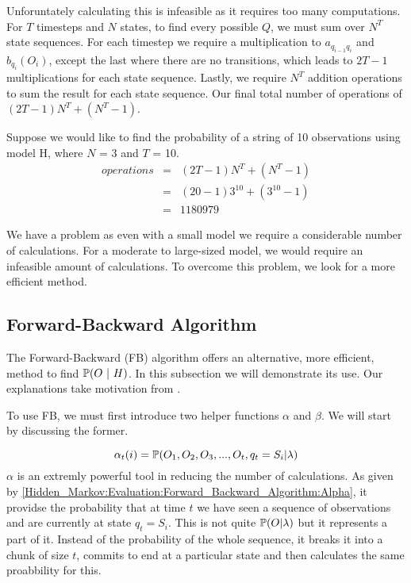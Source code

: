 Unforuntately calculating this is infeasible as it requires too many computations. For $T$ timesteps and $N$ states, to find every possible $Q$, we must sum over $N^T$ state sequences. For each timestep we require a multiplication to $a_{q_{i-1}q_{i}}$ and $b_{q_i}(O_i)$, except the last where there are no transitions, which leads to $2T-1$ multiplications for each state sequence. Lastly, we require $N^T$ addition operations to sum the result for each state sequence. Our final total number of operations of $(2T-1)N^T + (N^T-1)$. 

\begin{example}
    \label{Hidden_Markov:Evaluation:motivfb}
    Suppose we would like to find the probability of a string of 10 observations using model H, where $N$ = 3 and $T$ = 10. 
    \begin{eqnarray}
        operations & = & (2T-1)N^T + (N^T-1) \\
                   & = & (20-1)3^10 + (3^10 -1) \\
                   & = & 1180979
    \end{eqnarray}
\end{example}


We have a problem as even with a small model we require a considerable number of calculations. For a moderate to large-sized model, we would require an infeasible amount of calculations. To overcome this problem, we look for a more efficient method.



    \subsection{Forward-Backward Algorithm}
    \label{Hidden_Markov:Evaluation:Forward_Backward_Algorithm}

    The Forward-Backward (FB) algorithm offers an alternative, more efficient, method to find $\prob (O \ | \ H)$. In this subsection we will demonstrate its use. Our explanations take motivation from \cite{Rabiner1986}.

    To use FB, we must first introduce two helper functions $\alpha$ and $\beta$. We will start by discussing the former. 

    \begin{equation}
        \label{Hidden_Markov:Evaluation:Forward_Backward_Algorithm:Alpha}
        \alpha_t(i) = \mathbb{P} (O_1,O_2,O_3,...,O_t,q_t=S_i | \lambda)
    \end{equation}
    $\alpha$ is an extremly powerful tool in reducing the number of calculations. As given by \ref{Hidden_Markov:Evaluation:Forward_Backward_Algorithm:Alpha}, it providse the probability that at time $t$ we have seen a sequence of observations and are currently at state $q_t=S_i$. This is not quite $\mathbb{P} (O | \lambda)$ but it represents a part of it. Instead of the probability of the whole sequence, it breaks it into a chunk of size $t$, commits to end at a particular state and then calculates the same proabbility for this.

